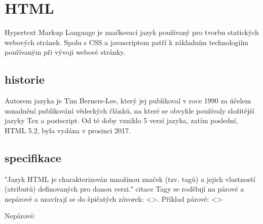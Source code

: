 \documentclass[main.tex]{subfiles}
\begin{document}
\section{HTML}
Hypertext Markup Language je značkovací jazyk používaný pro tvorbu statických webových stránek. Spolu s CSS a javascriptem patří k základním technologiím pouřívaným při vývoji webové stránky. 
\subsection{historie}
Autorem jazyka je Tim Berners-Lee, který jej publikoval v roce 1990 za účelem usnadnění publikování vědeckých článků, na které se obvykle používaly složitější jazyky Tex a postscript. Od té doby vzniklo 5 verzí jazyka, zatím poslední, HTML 5.2, byla vydána v prosinci 2017.

\subsection{specifikace}
"Jazyk HTML je charakterizován množinou značek (tzv. tagů) a jejich vlastností (atributů) definovaných pro danou verzi." citace Tagy se rodělují na párové a nepárové a uzavírají se do špičatých závorek: <>.
Příklad párové: <>

Nepárové:
\end{document}
